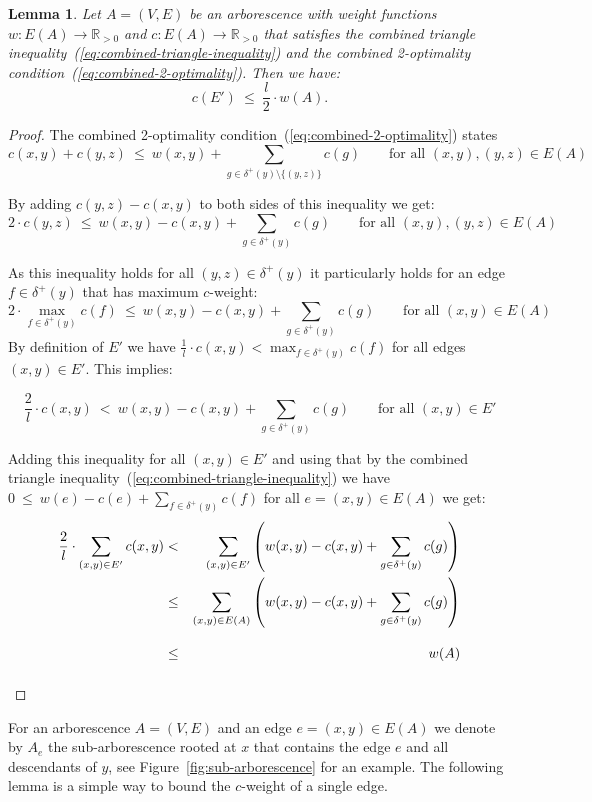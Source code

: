 \documentclass[a4paper, 11pt]{article}
\newtheorem{lemma}[theorem]{Lemma}
\begin{document}
\begin{lemma}
Let $A=(V,E)$ be an arborescence with weight functions $w:E(A)\to \mathbb{R}_{> 0}$ and $c:E(A)\to \mathbb{R}_{> 0}$
that satisfies the combined triangle inequality~(\ref{eq:combined-triangle-inequality}) and 
the combined 2-optimality condition~(\ref{eq:combined-2-optimality}).
Then we have: \[ c(E') ~\le~ \frac{l}{2} \cdot w(A) .\]
\label{lemma:E'}
\end{lemma}
\begin{proof}
The combined 2-optimality condition~(\ref{eq:combined-2-optimality}) states
$$c(x,y) + c(y,z) ~\le~ w(x,y) + \sum_{g\in \delta^+(y)\setminus\{(y,z)\}} c(g) \mbox{~~~~~ for all } (x,y), (y,z) \in E(A) $$


By adding $c(y,z) - c(x,y)$ to both sides of this inequality we get:
$$ 2 \cdot c(y,z) ~\le~ w(x,y) - c(x,y) + \sum_{g\in \delta^+(y)} c(g) \mbox{~~~~~ for all } (x,y), (y,z) \in E(A) $$

As this inequality holds for all $(y,z) \in \delta^+(y)$ it particularly holds for an edge $f\in\delta^+(y)$ that has maximum
$c$-weight:
$$ 2 \cdot \max_{f\in\delta^+(y)} c(f) ~\le~ w(x,y) - c(x,y) + \sum_{g\in \delta^+(y)} c(g) \mbox{~~~~~ for all } (x,y) \in E(A) $$
By definition of $E'$ we have $\displaystyle \frac1l \cdot c(x,y) <  \max_{f\in \delta^+(y)} c(f)$ for all edges $(x,y)\in E'$. 
This implies:

$$ \frac2l \cdot c(x,y) ~<~ w(x,y) - c(x,y) + \sum_{g\in \delta^+(y)} c(g) \mbox{~~~~~ for all } (x,y) \in E'$$

Adding this inequality for all $(x,y)\in E'$ and using that by the 
combined triangle inequality~(\ref{eq:combined-triangle-inequality})
we have $0  ~\le~ w(e) - c(e) + \sum_{f\in \delta^+(y)} c(f)$ for all $e= (x,y)\in E(A)$
we get:
\begin{eqnarray*}
\frac{2}{l}\cdot \sum_{(x,y)\in E'} c(x,y) & < &  \sum_{(x,y)\in E'}\left( w(x,y) - c(x,y) + \sum_{g\in \delta^+(y)} c(g)\right) \\
                                           &\le&  \sum_{(x,y)\in E(A)}\left( w(x,y) - c(x,y) + \sum_{g\in \delta^+(y)} c(g)\right) \\
                                           & \le & w(A)\vphantom{\left(\sum_x\right)}
\end{eqnarray*} 
\end{proof}



For an arborescence $A=(V,E)$ and an edge $e = (x,y)\in E(A)$ we denote by
$A_e$ the sub-arborescence rooted at $x$ that contains the edge $e$ and all descendants of $y$, see Figure~\ref{fig:sub-arborescence} for an example. The following lemma is a simple way to bound the $c$-weight of a single edge.
 
\end{document}
